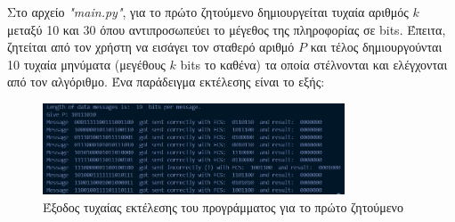 \documentclass[12pt,a4paper]{article}
\begin{document}
Στο αρχείο \textit{"main.py"}, για το πρώτο ζητούμενο δημιουργείται τυχαία αριθμός $k$ μεταξύ 10 και 30 όπου αντιπροσωπεύει το μέγεθος της πληροφορίας σε bits. Έπειτα, ζητείται από τον χρήστη να εισάγει τον σταθερό αριθμό $P$ και τέλος δημιουργούνται 10 τυχαία μηνύματα (μεγέθους $k$ bits το καθένα) τα οποία στέλνονται και ελέγχονται από τον αλγόριθμο. Ένα παράδειγμα εκτέλεσης είναι το εξής:
\begin{figure}[h]
    \centering
    \includegraphics[width=0.8\textwidth]{exampleRun}
    \caption{Έξοδος τυχαίας εκτέλεσης του προγράμματος για το πρώτο ζητούμενο}
    \label{fig:example}
\end{figure}
\end{document}
